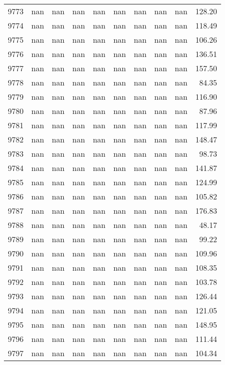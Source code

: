 \begin{tabular}{lrrrrrrrrr}
9773 & nan & nan & nan & nan & nan & nan & nan & nan & 128.20 \\
9774 & nan & nan & nan & nan & nan & nan & nan & nan & 118.49 \\
9775 & nan & nan & nan & nan & nan & nan & nan & nan & 106.26 \\
9776 & nan & nan & nan & nan & nan & nan & nan & nan & 136.51 \\
9777 & nan & nan & nan & nan & nan & nan & nan & nan & 157.50 \\
9778 & nan & nan & nan & nan & nan & nan & nan & nan & 84.35 \\
9779 & nan & nan & nan & nan & nan & nan & nan & nan & 116.90 \\
9780 & nan & nan & nan & nan & nan & nan & nan & nan & 87.96 \\
9781 & nan & nan & nan & nan & nan & nan & nan & nan & 117.99 \\
9782 & nan & nan & nan & nan & nan & nan & nan & nan & 148.47 \\
9783 & nan & nan & nan & nan & nan & nan & nan & nan & 98.73 \\
9784 & nan & nan & nan & nan & nan & nan & nan & nan & 141.87 \\
9785 & nan & nan & nan & nan & nan & nan & nan & nan & 124.99 \\
9786 & nan & nan & nan & nan & nan & nan & nan & nan & 105.82 \\
9787 & nan & nan & nan & nan & nan & nan & nan & nan & 176.83 \\
9788 & nan & nan & nan & nan & nan & nan & nan & nan & 48.17 \\
9789 & nan & nan & nan & nan & nan & nan & nan & nan & 99.22 \\
9790 & nan & nan & nan & nan & nan & nan & nan & nan & 109.96 \\
9791 & nan & nan & nan & nan & nan & nan & nan & nan & 108.35 \\
9792 & nan & nan & nan & nan & nan & nan & nan & nan & 103.78 \\
9793 & nan & nan & nan & nan & nan & nan & nan & nan & 126.44 \\
9794 & nan & nan & nan & nan & nan & nan & nan & nan & 121.05 \\
9795 & nan & nan & nan & nan & nan & nan & nan & nan & 148.95 \\
9796 & nan & nan & nan & nan & nan & nan & nan & nan & 111.44 \\
9797 & nan & nan & nan & nan & nan & nan & nan & nan & 104.34 \\

\end{tabular}
